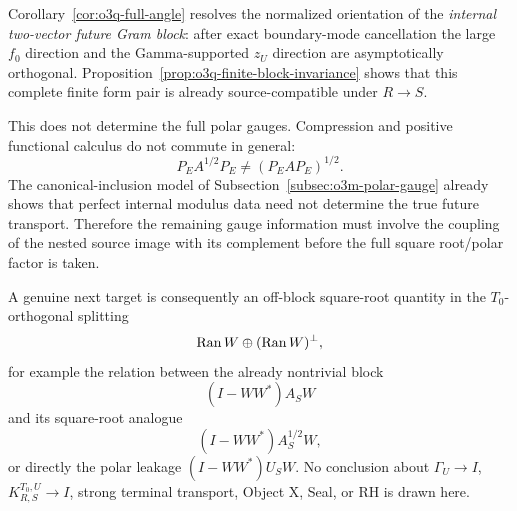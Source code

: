 \begin{remark}
\label{rem:o3q-firewall}
Corollary~\ref{cor:o3q-full-angle} resolves the normalized orientation of the
\emph{internal two-vector future Gram block}: after exact boundary-mode cancellation the
large $f_0$ direction and the Gamma-supported $z_U$ direction are asymptotically
orthogonal.  Proposition~\ref{prop:o3q-finite-block-invariance} shows that this complete
finite form pair is already source-compatible under $R\to S$.

This does not determine the full polar gauges.  Compression and positive functional
calculus do not commute in general:
\[
 P_EA^{1/2}P_E\ne(P_EAP_E)^{1/2}.
\]
The canonical-inclusion model of Subsection~\ref{subsec:o3m-polar-gauge} already shows
that perfect internal modulus data need not determine the true future transport.
Therefore the remaining gauge information must involve the coupling of the nested
source image with its complement before the full square root/polar factor is taken.

A genuine next target is consequently an off-block square-root quantity in the
$T_0$-orthogonal splitting
\[
 \operatorname{Ran} W\oplus(\operatorname{Ran} W)^\perp,
\]
for example the relation between the already nontrivial block
\[
 (I-WW^*)A_SW
\]
and its square-root analogue
\[
 (I-WW^*)A_S^{1/2}W,
\]
or directly the polar leakage $(I-WW^*)U_SW$.
No conclusion about $\Gamma_U\to I$, $K_{R,S}^{T_0,U}\to I$, strong terminal
transport, Object X, Seal, or RH is drawn here.
\end{remark}

